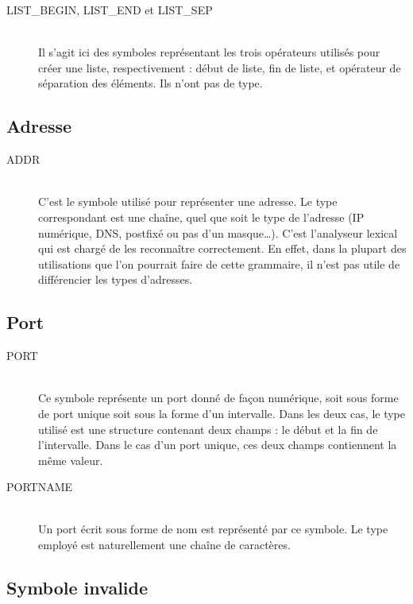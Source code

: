 \documentclass[a4paper,11pt]{report}
\begin{document}
\begin{description}
  \item[LIST\_BEGIN, LIST\_END et LIST\_SEP]~\\
    Il s'agit ici des symboles représentant les trois opérateurs utilisés pour
    créer une liste, respectivement : début de liste, fin de liste, et
    opérateur de séparation des éléments. Ils n'ont pas de type.
\end{description}

\subsection{Adresse}

\begin{description}
  \item[ADDR]~\\
    C'est le symbole utilisé pour représenter une adresse. Le type
    correspondant est une chaîne, quel que soit le type de l'adresse (IP
    numérique, DNS, postfixé ou pas d'un masque\dots). C'est l'analyseur
    lexical qui est chargé de les reconnaître correctement. En effet, dans la
    plupart des utilisations que l'on pourrait faire de cette grammaire, il
    n'est pas utile de différencier les types d'adresses.
\end{description}

\subsection{Port}

\begin{description}
  \item[PORT]~\\
    Ce symbole représente un port donné de façon numérique, soit sous forme
    de port unique soit sous la forme d'un intervalle. Dans les deux cas, le
    type utilisé est une structure contenant deux champs : le début et la fin
    de l'intervalle. Dans le cas d'un port unique, ces deux champs contiennent
    la même valeur.

  \item[PORTNAME]~\\
    Un port écrit sous forme de nom est représenté par ce symbole. Le type
    employé est naturellement une chaîne de caractères.
\end{description}

\subsection{Symbole invalide}
\end{document}
